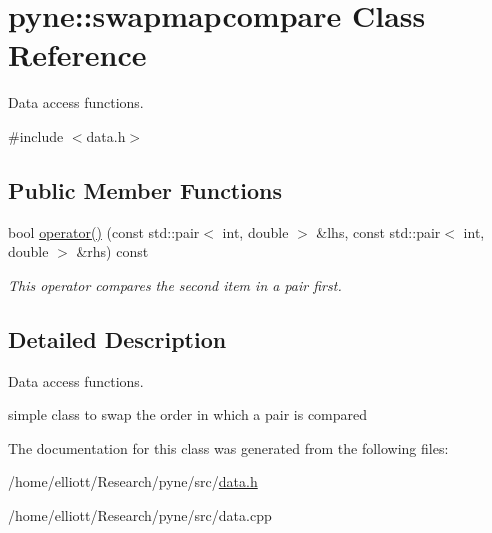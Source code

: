 \hypertarget{classpyne_1_1swapmapcompare}{\section{pyne\-:\-:swapmapcompare Class Reference}
\label{classpyne_1_1swapmapcompare}
}


Data access functions.  




{\ttfamily \#include $<$data.\-h$>$}

\subsection*{Public Member Functions}
\begin{DoxyCompactItemize}
\item 
\hypertarget{classpyne_1_1swapmapcompare_a766adfc375aa681d00aa60ac66a1fdd9}{bool \hyperlink{classpyne_1_1swapmapcompare_a766adfc375aa681d00aa60ac66a1fdd9}{operator()} (const std\-::pair$<$ int, double $>$ \&lhs, const std\-::pair$<$ int, double $>$ \&rhs) const }\label{classpyne_1_1swapmapcompare_a766adfc375aa681d00aa60ac66a1fdd9}

\begin{DoxyCompactList}\small\item\em This operator compares the second item in a pair first. \end{DoxyCompactList}\end{DoxyCompactItemize}


\subsection{Detailed Description}
Data access functions. 

simple class to swap the order in which a pair is compared 

The documentation for this class was generated from the following files\-:\begin{DoxyCompactItemize}
\item 
/home/elliott/\-Research/pyne/src/\hyperlink{data_8h}{data.\-h}\item 
/home/elliott/\-Research/pyne/src/data.\-cpp\end{DoxyCompactItemize}
